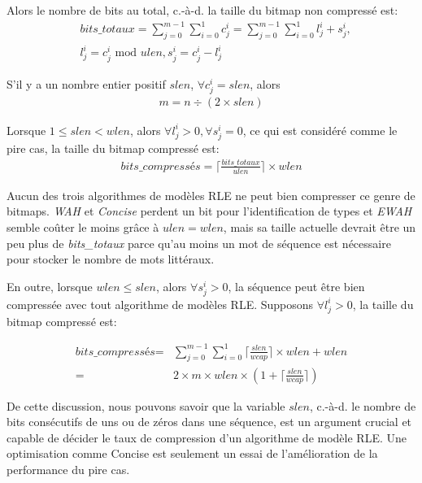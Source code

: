 Alors le nombre de bits au total, c.-à-d. la taille du bitmap non compressé est:
\begin{align*}
& \textit{bits\_totaux} = \sum_{j = 0}^{m - 1} \sum_{i = 0}^1 c^i_j = \sum_{j = 0}^{m - 1} \sum_{i = 0}^1 l^i_j + s^i_j, \\
& l^i_j = c^i_j \text{ mod } ulen, s^i_j = c^i_j - l^i_j
\end{align*}

S'il y a un nombre entier positif $slen$, $\forall c^i_j = slen$, alors
\begin{align}
m = n \div (2 \times slen) \label{eq:seqnum}
\end{align}

Lorsque $1 \leq slen < wlen$, alors $\forall l^i_j > 0, \forall s^i_j = 0$, ce qui est considéré comme le pire cas, la taille du bitmap compressé est:
\begin{align*}
\textit{bits\_compressés} = \lceil \frac{\textit{bits\_totaux}}{ulen} \rceil \times wlen 
\end{align*}

Aucun des trois algorithmes de modèles RLE ne peut bien compresser ce genre de bitmaps. \emph{WAH} et \emph{Concise} perdent un bit pour l'identification de types et \emph{EWAH} semble coûter le moins grâce à $ulen = wlen$, mais sa taille actuelle devrait être un peu plus de \textit{bits\_totaux} parce qu'au moins un mot de séquence est nécessaire pour stocker le nombre de mots littéraux.

En outre, lorsque $wlen \leq slen$, alors $\forall s^i_j > 0$, la séquence peut être bien compressée avec tout algorithme de modèles RLE. Supposons $\forall l^i_j > 0$, la taille du bitmap compressé est:

\begin{align*}
\textit{bits\_compressés} = &\sum_{j = 0}^{m - 1} \sum_{i = 0}^1 \lceil \frac{slen}{wcap} \rceil \times wlen + wlen \\
= & 2 \times m \times wlen \times (1 + \lceil \frac{slen}{wcap} \rceil)
\end{align*}

De cette discussion, nous pouvons savoir que la variable $slen$, c.-à-d. le nombre de bits consécutifs de uns ou de zéros dans une séquence, est un argument crucial et capable de décider le taux de compression d'un algorithme de modèle RLE. Une optimisation comme Concise est seulement un essai de l'amélioration de la performance du pire cas.


